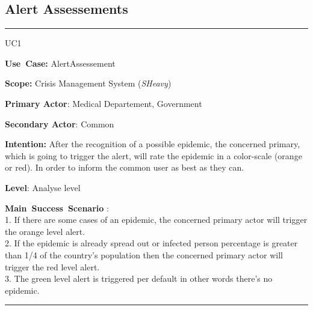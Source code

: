 \subsection{Alert Assessements}
\vspace{0.5cm}
\hrule
\vspace{0.5cm}
\begin{lyxlist}{UC1}
\small{
\item [\textbf{Use~Case:}] AlertAssessement
\item [\textbf{Scope:}] Crisis Management System (\emph{SHeavy})
\item [\textbf{Primary Actor}:] Medical Departement, Government
\item [\textbf{Secondary Actor}:] Common
\item [\textbf{Intention:}] After the recognition of a possible epidemic, the
concerned primary, which is going to trigger the alert, will rate the epidemic
in a color-scale (orange or red). In order to inform the common user as best as
they can.
\item [\textbf{Level}:]Analyse level
\item [\textbf{Main~Success~Scenario}]:\\
1. If there are some cases of an epidemic, the concerned primary actor will
trigger the orange level alert.\\
2. If the epidemic is already spread out or infected person percentage is
greater than 1/4 of the country's population then the concerned primary actor
will trigger the red level alert.\\
3. The green level alert is triggered per default in other words there's no
epidemic.\\ 
}
\end{lyxlist}
\hrule
\vspace{0.5cm} 


